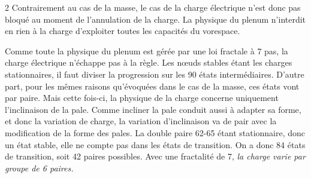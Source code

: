 \begin{multicols}{2}
Contrairement au cas de la masse, le cas de la charge électrique n'est
donc pas bloqué au moment de l'annulation de la charge. La physique du
plenum n'interdit en rien à la charge d'exploiter toutes les capacités
du vorespace.
\vspace*{-0.5cm}
\begin{center}
\end{center}



Comme toute la physique du plenum est gérée par une loi fractale à 7 pas, la charge
électrique n'échappe pas à la règle. Les nœuds stables étant les
charges stationnaires, il faut diviser la progression sur les 90 états
intermédiaires. D'autre part, pour les mêmes raisons qu'évoquées dans
le cas de la masse, ces états vont par paire. Mais cette fois-ci, la
physique de la charge concerne uniquement l'inclinaison de la pale.
Comme incliner la pale conduit aussi à adapter sa forme, et donc la
variation de charge, la variation d'inclinaison va de pair avec la
modification de la forme des pales. La double paire 62-65 étant
stationnaire, donc un état stable, elle ne compte pas dans les
états de transition. On a donc 84 états de transition, soit 42 paires
possibles. Avec une fractalité de 7, \textit{la charge varie par groupe de 6
paires.}


\end{multicols}
